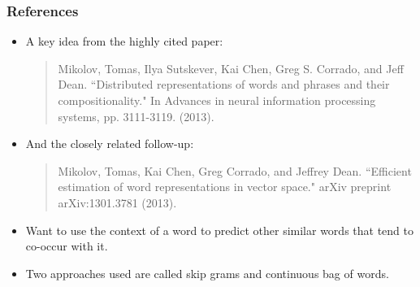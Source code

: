 \begin{frame}\frametitle{References}
\begin{itemize}
\item A key idea from the highly cited paper:
\begin{quote}
Mikolov, Tomas, Ilya Sutskever, Kai Chen, Greg S. Corrado, and
Jeff Dean. ``Distributed representations of words and phrases
and their compositionality." In Advances in neural information
processing systems, pp. 3111-3119. (2013).
\end{quote}
\item And the closely related follow-up:
\begin{quote}
Mikolov, Tomas, Kai Chen, Greg Corrado, and Jeffrey Dean.
``Efficient estimation of word representations in vector space."
arXiv preprint arXiv:1301.3781 (2013).
\end{quote}
\item Want to use the context of a word to predict other similar
words that tend to co-occur with it.
\item  Two approaches used are called {skip grams} and {continuous bag of words}.
\end{itemize}
\end{frame}

